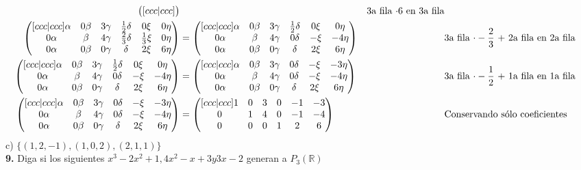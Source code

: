 \documentclass[letterpaper]{article}
\newcommand{\R}{\mathds{R}}
\renewcommand{\*}{\cdot}
\theoremstyle{definition}
\begin{document}
\begin{align*}
\begin{pmatrix}[ccc|ccc]
			\end{pmatrix} && \text{3a fila $ \* 6 $ en 3a fila}\\
			 \begin{pmatrix}[ccc|ccc]
			 \alpha & 0\beta & 3\gamma & \frac{1}{2}\delta & 0\xi & 0\eta\\
			 0\alpha & \beta & 4\gamma& \frac{2}{3}\delta & \frac{1}{3}\xi & 0\eta\\
			 0\alpha & 0\beta & 0\gamma & \delta & 2\xi & 6\eta
			 \end{pmatrix} & =  \begin{pmatrix}[ccc|ccc]
			 \alpha & 0\beta & 3\gamma & \frac{1}{2}\delta & 0\xi & 0\eta\\
			 0\alpha & \beta & 4\gamma& 0\delta & -\xi & -4\eta\\
			 0\alpha & 0\beta & 0\gamma & \delta & 2\xi & 6\eta
			 \end{pmatrix} && \text{3a fila $ \* -\dfrac{2}{3} $ + 2a fila en 2a fila}\\\begin{pmatrix}[ccc|ccc]
			 \alpha & 0\beta & 3\gamma & \frac{1}{2}\delta & 0\xi & 0\eta\\
			 0\alpha & \beta & 4\gamma& 0\delta & -\xi & -4\eta\\
			 0\alpha & 0\beta & 0\gamma & \delta & 2\xi & 6\eta
			 \end{pmatrix} & = \begin{pmatrix}[ccc|ccc]
			 \alpha & 0\beta & 3\gamma & 0\delta & -\xi & -3\eta\\
			 0\alpha & \beta & 4\gamma& 0\delta & -\xi & -4\eta\\
			 0\alpha & 0\beta & 0\gamma & \delta & 2\xi & 6\eta
			 \end{pmatrix} && \text{3a fila $ \* -\dfrac{1}{2} $ + 1a fila en 1a fila}\\
			 \begin{pmatrix}[ccc|ccc]
			 \alpha & 0\beta & 3\gamma & 0\delta & -\xi & -3\eta\\
			 0\alpha & \beta & 4\gamma& 0\delta & -\xi & -4\eta\\
			 0\alpha & 0\beta & 0\gamma & \delta & 2\xi & 6\eta
			 \end{pmatrix} & = \begin{pmatrix}[ccc|ccc]
			 1 & 0 & 3 & 0 & -1 & -3\\
			 0 & 1 & 4& 0 & -1 & -4\\
			 0 & 0 & 0 & 1 & 2 & 6
			 \end{pmatrix} && \text{Conservando sólo coeficientes }
		\end{align*}
	c) $\lbrace (1,2,-1),(1,0,2),(2,1,1) \rbrace$\\
\noindent \textbf{9.} Diga si los siguientes $x^3-2x^2+1,4x^2-x+3 y 3x-2$ generan a $P_{3}(\R)$
\end{document}
